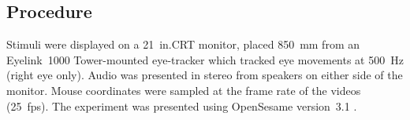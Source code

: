 \documentclass[a4paper,man,natbib]{apa6}
\begin{document}
%
%

\subsection{Procedure}
Stimuli were displayed on a 21~in.\@ CRT monitor, placed 850~mm from an Eyelink~1000 Tower-mounted eye-tracker which tracked eye movements at 500~Hz (right eye only). 
Audio was presented in stereo from speakers on either side of the monitor. 
Mouse coordinates were sampled at the frame rate of the videos (25~fps). 
The experiment was presented using OpenSesame version~3.1 \citep{Mathot2012}.

 
\end{document}
